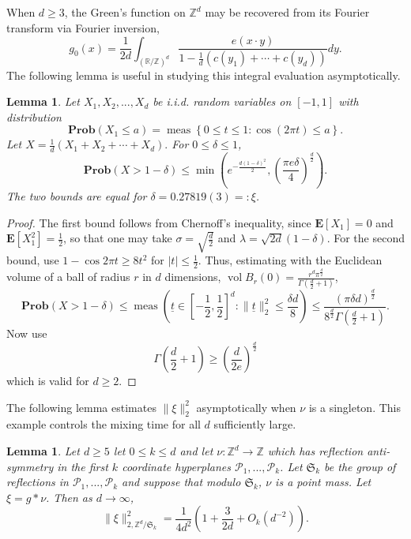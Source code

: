 \documentclass[a4paper, 12pt, notitlepage]{amsart}
\newcommand{\meas}{\operatorname{meas}}
\newcommand{\vol}{\operatorname{vol}}
\newcommand{\bR}{\mathbb{R}}
\newcommand{\zed}{\mathbb{Z}}
\newcommand{\E}{\mathbf{E}}
\newcommand{\Prob}{\mathbf{Prob}}
\newcommand{\ut}{\underline{t}}
\newcommand{\sP}{{\mathscr{P}}}
\newcommand{\fS}{{\mathfrak{S}}}
\newtheorem{lemma}[theorem]{Lemma}
\theoremstyle{remark}
\begin{document}
When $d \geq 3$, the Green's function on $\zed^d$ may be recovered from its Fourier transform via Fourier inversion,
\begin{equation}
 g_0(x) = \frac{1}{2d} \int_{(\bR/\zed)^d} \frac{e(x\cdot y)}{1-\frac{1}{d}(c(y_1) + \cdots + c(y_d) )}dy.
\end{equation}
The following lemma is useful in studying this integral evaluation asymptotically.
\begin{lemma}
 Let $X_1, X_2, ..., X_d$ be i.i.d. random variables on $[-1, 1]$ with distribution 
 \begin{equation}
  \Prob(X_1 \leq a) = \meas\left\{0 \leq t \leq 1: \cos(2\pi t) \leq a\right\}.
 \end{equation}
Let $X = \frac{1}{d}(X_1 + X_2 + \cdots + X_d).$  For $0 \leq \delta \leq 1$, 
\begin{equation}
 \Prob(X > 1-\delta) \leq \min\left(e^{-\frac{d(1-\delta)^2}{2}}, \left(\frac{\pi e\delta}{4}\right)^{\frac{d}{2}} \right) .
\end{equation}
The two bounds are equal for $\delta = 0.27819(3)=:\xi$.
\end{lemma}
\begin{proof}
 The first bound follows from Chernoff's inequality, since $\E[X_1] = 0$ and $\E[X_1^2] = \frac{1}{2}$, so that one may take $\sigma = \sqrt{\frac{d}{2}}$ and $\lambda = \sqrt{2d}(1-\delta)$.
 For the second bound, use $1-\cos 2\pi t \geq 8t^2$ for $|t| \leq \frac{1}{2}$. Thus, estimating with the Euclidean volume of a ball of radius $r$ in $d$ dimensions, 
 $\vol B_r(0) = \frac{r^d \pi^{\frac{d}{2}}}{\Gamma\left(\frac{d}{2}+1 \right)}$,
 \begin{equation}
 \Prob(X > 1-\delta) \leq \meas\left(\ut \in \left[-\frac{1}{2}, \frac{1}{2}\right]^d: \|\ut\|_2^2 \leq \frac{\delta d}{8} \right)\leq \frac{(\pi \delta d)^{\frac{d}{2}}}{8^{\frac{d}{2}}\Gamma\left(\frac{d}{2}+1 \right)}.
\end{equation}
Now use 
\begin{equation}
 \Gamma\left(\frac{d}{2}+1\right) \geq \left(\frac{d}{2e} \right)^{\frac{d}{2}}
\end{equation}
which is valid for $d \geq 2$.
\end{proof}

The following lemma estimates $\|\xi\|_2^2$ asymptotically when $\nu$ is a singleton.  This example controls the mixing time for all $d$ sufficiently large.

\begin{lemma}\label{Greens_fn_evaluation_d}
 Let $d \geq 5$ let $0 \leq k \leq d$ and let $\nu:\zed^d \to \zed$ which has reflection anti-symmetry in the first $k$ coordinate hyperplanes $\sP_1, ..., \sP_k$. Let $\fS_k$ be the group of reflections in $\sP_1, ..., \sP_k$ and suppose that modulo $\fS_k$, $\nu$ is a point mass. Let $\xi = g*\nu$.  Then as $d \to \infty$,
 \begin{equation}
  \|\xi\|_{2, \zed^d/\fS_k}^2 = \frac{1}{4d^2}\left(1 + \frac{3}{2d} + O_k\left(d^{-2}\right)\right).
 \end{equation}

\end{lemma}
\end{document}
